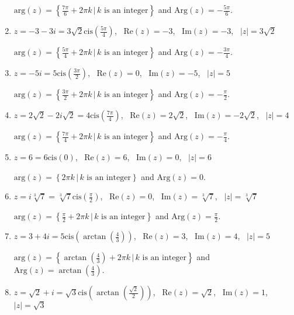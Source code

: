 \begin{enumerate}
$\text{arg}(z) = \left\{\frac{7\pi}{6} + 2\pi k \, | \, \text{$k$ is an integer} \right\}$ and $\text{Arg}(z) = -\frac{5\pi}{6}$.

\item $z = -3-3i = 3\sqrt{2}\text{cis}\left(\frac{5\pi}{4}\right)$, \, $\text{Re}(z) = -3$, \, $\text{Im}(z) =-3$, \, $|z| = 3\sqrt{2}$

$\text{arg}(z) = \left\{\frac{5\pi}{4} + 2\pi k \, | \, \text{$k$ is an integer} \right\}$ and $\text{Arg}(z) = -\frac{3\pi}{4}$.

\item $z = -5i = 5\text{cis}\left(\frac{3\pi}{2}\right)$, \, $\text{Re}(z) = 0$, \, $\text{Im}(z) = -5$, \, $|z| = 5$

$\text{arg}(z) = \left\{\frac{3\pi}{2} + 2\pi k \, | \, \text{$k$ is an integer} \right\}$ and $\text{Arg}(z) = -\frac{\pi}{2}$.

\item $z = 2\sqrt{2} - 2i\sqrt{2} = 4\text{cis}\left(\frac{7\pi}{4}\right)$, \, $\text{Re}(z) = 2\sqrt{2}$, \, $\text{Im}(z) = -2\sqrt{2}$, \, $|z| = 4$

$\text{arg}(z) = \left\{\frac{7\pi}{4} + 2\pi k \, | \, \text{$k$ is an integer} \right\}$ and $\text{Arg}(z) = -\frac{\pi}{4}$.

\item $z =6 = 6\text{cis}\left(0\right)$, \, $\text{Re}(z) = 6$, \, $\text{Im}(z) = 0$, \, $|z| = 6$

$\text{arg}(z) = \left\{2\pi k \, | \, \text{$k$ is an integer} \right\}$ and $\text{Arg}(z) =0$.

\item $z = i \sqrt[3]{7} = \sqrt[3]{7}\text{cis}\left(\frac{\pi}{2}\right)$, \, $\text{Re}(z) =0$, \, $\text{Im}(z) = \sqrt[3]{7}$, \, $|z| = \sqrt[3]{7}$

$\text{arg}(z) = \left\{\frac{\pi}{2} + 2\pi k \, | \, \text{$k$ is an integer} \right\}$ and $\text{Arg}(z) = \frac{\pi}{2}$.

\item $z = 3+4i = 5\text{cis}\left(\arctan\left(\frac{4}{3}\right)\right)$, \, $\text{Re}(z) = 3$, \, $\text{Im}(z) = 4$, \, $|z| = 5$

$\text{arg}(z) = \left\{\arctan\left(\frac{4}{3}\right) + 2\pi k \, | \, \text{$k$ is an integer} \right\}$ and $\text{Arg}(z) =\arctan\left(\frac{4}{3}\right) $.

\item $z = \sqrt{2}+i = \sqrt{3}\text{cis}\left(\arctan\left(\frac{\sqrt{2}}{2}\right)\right)$, \, $\text{Re}(z) = \sqrt{2}$, \, $\text{Im}(z) = 1$, \, $|z| = \sqrt{3}$


\end{enumerate}
